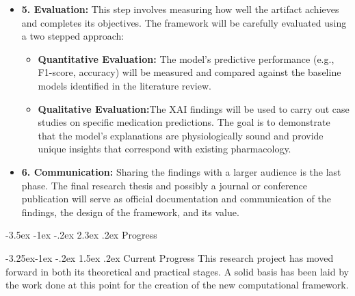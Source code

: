 \documentclass[12pt,a4paper]{article}
\makeatletter
\renewcommand\section{\@startsection{section}{1}{\z@}%
  {-3.5ex \@plus-1ex \@minus-.2ex}%
  {2.3ex \@plus.2ex}%
  {\normalfont\large\bfseries}}
\renewcommand\subsection{\@startsection{subsection}{2}{\z@}%
  {-3.25ex\@plus-1ex \@minus-.2ex}%
  {1.5ex \@plus.2ex}%
  {\normalfont\normalsize\bfseries}}
\makeatother
\begin{document}
\begin{itemize}
    \item \textbf{5. Evaluation:} This step involves measuring how well the artifact achieves and completes its objectives. The framework will be carefully evaluated using a two stepped approach:
        \begin{itemize}
            \item \textbf{Quantitative Evaluation:} The model's predictive performance (e.g., F1-score, accuracy) will be measured and compared against the baseline models identified in the literature review.
            \item \textbf{Qualitative Evaluation:}The XAI findings will be used to carry out case studies on specific medication predictions. The goal is to demonstrate that the model's explanations are physiologically sound and provide unique insights that correspond with existing pharmacology.
        \end{itemize}

    \item \textbf{6. Communication:} Sharing the findings with a larger audience is the last phase. The final research thesis and possibly a journal or conference publication will serve as official documentation and communication of the findings, the design of the framework, and its value.
\end{itemize}


\section{Progress}

\subsection{Current Progress}
This research project has moved forward in both its theoretical and practical stages. A solid basis has been laid by the work done at this point for the creation of the new computational framework.
\end{document}
